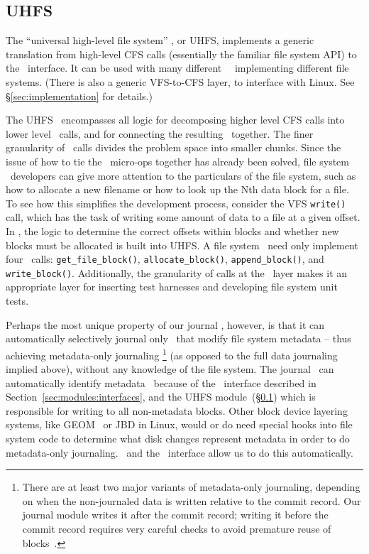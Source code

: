 \subsection{UHFS}
\label{sec:modules:uhfs}

The ``universal high-level file system'' \module, or UHFS, implements a generic
translation from high-level CFS calls (essentially the familiar file system API)
to the \LFS\ interface. It can be used with many different \LFS\ \modules\
implementing different file systems. (There is also a generic VFS-to-CFS layer,
to interface with Linux. See \S\ref{sec:implementation} for details.)

The UHFS \module\ encompasses all logic for decomposing higher level CFS calls
into lower level \LFS\ calls, and for connecting the resulting \chdescs\
together. The finer granularity of \LFS\ calls divides the problem space into
smaller chunks. Since the issue of how to tie the \LFS\ micro-ops together has
already been solved, file system \module\ developers can give more attention to
the particulars of the file system, such as how to allocate a new filename or
how to look up the Nth data block for a file. To see how this simplifies the
development process, consider the VFS \texttt{write()} call, which has the task
of writing some amount of data to a file at a given offset. In \Kudos, the logic
to determine the correct offsets within blocks and whether new blocks must be
allocated is built into UHFS. A file system \module\ need only implement four
\LFS\ calls: \texttt{get\_file\_block()}, \texttt{allocate\_block()},
\texttt{append\_block()}, and \texttt{write\_block()}. Additionally, the
granularity of calls at the \LFS\ layer makes it an appropriate layer for
inserting test harnesses and developing file system unit tests.


Perhaps the most unique property of our journal \module, however, is that it can
automatically selectively journal only \chdescs\ that modify file system
metadata -- thus achieving metadata-only journaling \footnote{There are at least
two major variants of metadata-only journaling, depending on when the
non-journaled data is written relative to the commit record. Our journal module
writes it after the commit record; writing it before the commit record requires
very careful checks to avoid premature reuse of blocks~\cite{tweedie00ext3}.}
(as opposed to the full data journaling implied above), without any knowledge of
the file system.
%
The journal \module\ can automatically identify metadata \chdescs\ because of
the \LFS\ interface described in Section~\ref{sec:modules:interfaces}, and the
UHFS module~(\S\ref{sec:modules:uhfs}) which is responsible for writing to all
non-metadata blocks. Other block device layering systems, like GEOM~\cite{geom}
or JBD in Linux, would or do need special hooks into file system code to
determine what disk changes represent metadata in order to do metadata-only
journaling. \Chdescs\ and the \LFS\ interface allow us to do this automatically.
